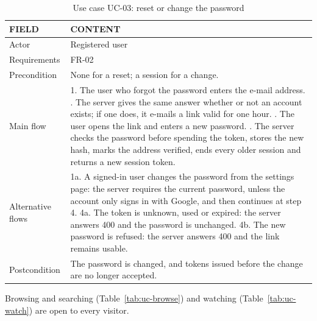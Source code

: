 \begin{table}[H]
\centering
\caption{Use case UC-03: reset or change the password}
\label{tab:uc-reset}
\small
\begin{tabularx}{\textwidth}{p{} X}
\toprule
\textbf{FIELD} & \textbf{CONTENT} \\
\midrule
Actor & Registered user \\
Requirements & FR-02 \\
Precondition & None for a reset; a session for a change. \\
Main flow &
  1. The user who forgot the password enters the e-mail address. \newline
  2. The server gives the same answer whether or not an account exists; if one does, it e-mails a link valid for one hour. \newline
  3. The user opens the link and enters a new password. \newline
  4. The server checks the password before spending the token, stores the new hash, marks the address verified, ends every older session and returns a new session token. \\
Alternative flows &
  1a. A signed-in user changes the password from the settings page: the server requires the current password, unless the account only signs in with Google, and then continues at step 4. \newline
  4a. The token is unknown, used or expired: the server answers 400 and the password is unchanged. \newline
  4b. The new password is refused: the server answers 400 and the link remains usable. \\
Postcondition & The password is changed, and tokens issued before the change are no longer accepted. \\
\bottomrule
\end{tabularx}
\end{table}

Browsing and searching (Table~\ref{tab:uc-browse}) and watching (Table~\ref{tab:uc-watch}) are
open to every visitor.

